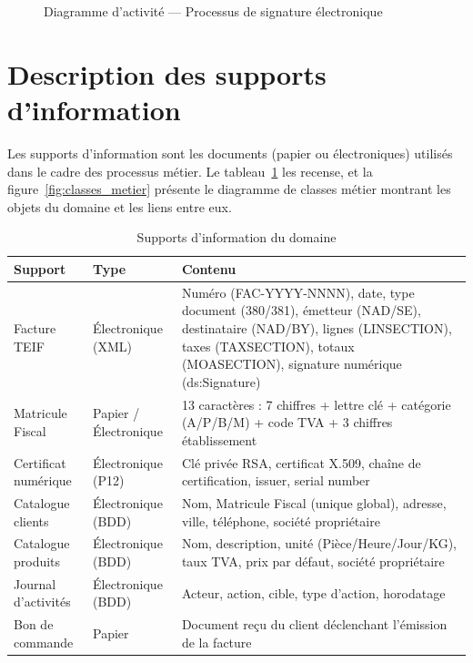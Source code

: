 \documentclass[a4paper,12pt]{report}
\begin{document}
\begin{figure}[htbp]
\caption{Diagramme d'activité — Processus de signature électronique}
\label{fig:act_signature}
\end{figure}


\section{Description des supports d'information}

Les supports d'information sont les documents (papier ou électroniques) utilisés dans le cadre des processus métier. Le tableau~\ref{tab:supports} les recense, et la figure~\ref{fig:classes_metier} présente le diagramme de classes métier montrant les objets du domaine et les liens entre eux.

\begin{table}[htbp]
\centering
\caption{Supports d'information du domaine}
\label{tab:supports}
\begin{tabularx}{\textwidth}{|l|l|X|}
\hline
\textbf{Support} & \textbf{Type} & \textbf{Contenu} \\
\hline
Facture TEIF & Électronique (XML) & Numéro (FAC-YYYY-NNNN), date, type document (380/381), émetteur (NAD/SE), destinataire (NAD/BY), lignes (LINSECTION), taxes (TAXSECTION), totaux (MOASECTION), signature numérique (ds:Signature) \\
\hline
Matricule Fiscal & Papier / Électronique & 13 caractères : 7 chiffres + lettre clé + catégorie (A/P/B/M) + code TVA + 3 chiffres établissement \\
\hline
Certificat numérique & Électronique (P12) & Clé privée RSA, certificat X.509, chaîne de certification, issuer, serial number \\
\hline
Catalogue clients & Électronique (BDD) & Nom, Matricule Fiscal (unique global), adresse, ville, téléphone, société propriétaire \\
\hline
Catalogue produits & Électronique (BDD) & Nom, description, unité (Pièce/Heure/Jour/KG), taux TVA, prix par défaut, société propriétaire \\
\hline
Journal d'activités & Électronique (BDD) & Acteur, action, cible, type d'action, horodatage \\
\hline
Bon de commande & Papier & Document reçu du client déclenchant l'émission de la facture \\
\hline
\end{tabularx}
\end{table}
\end{document}
